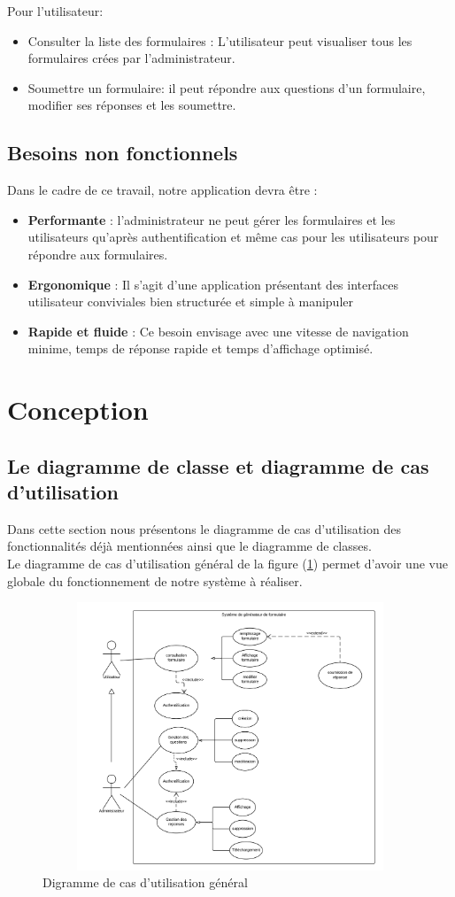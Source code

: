 Pour l'utilisateur:
\begin{itemize}
\item Consulter la liste des formulaires : L’utilisateur peut visualiser tous les formulaires crées par l’administrateur.
\item Soumettre un formulaire: il peut répondre aux questions d'un formulaire, modifier ses réponses et les soumettre.
\end{itemize}
    \subsection{Besoins non fonctionnels}
      Dans le cadre de ce travail, notre application devra être :
\begin{itemize}
 \item  \textbf{Performante} : l’administrateur ne peut gérer les formulaires et les utilisateurs qu’après authentification et même cas pour les utilisateurs pour répondre aux formulaires.
 \item \textbf{Ergonomique } : Il s’agit d’une application présentant des interfaces utilisateur conviviales bien structurée et simple à manipuler
 \item  \textbf{Rapide et fluide} : Ce besoin envisage avec une vitesse de navigation minime, temps de réponse rapide et temps d’affichage optimisé.
\end{itemize}
\section{Conception}
\subsection{Le diagramme de classe et diagramme de cas d’utilisation}
Dans cette section nous présentons le diagramme de cas d’utilisation des fonctionnalités déjà mentionnées ainsi que le diagramme de classes.\\
Le diagramme de cas d’utilisation général de la figure  (\ref{casgeneral}) permet d’avoir une vue globale du fonctionnement de notre système à réaliser.
\begin{figure}[H]
    \centering
    \includegraphics[width=14cm, height=8cm]{img/Diag_usecase.png}
    \caption{Digramme de cas d'utilisation général}
    \label{casgeneral}
\end{figure}

